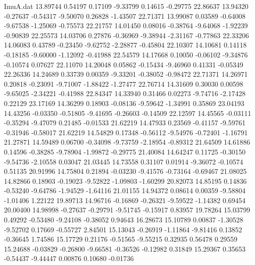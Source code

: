 \begin{filecontents}{ImuA.dat}
  13.89744    0.54197    0.17109   -9.33799    0.14615   -0.29775   22.86637
  13.94320   -0.27637   -0.54317   -9.50070    0.26828   -1.43507   22.71371
  13.99087    0.03589   -0.64008   -9.67538   -1.25069   -0.75573   22.21757
  14.01450    0.08016   -0.38764   -9.64068   -1.92239   -0.90839   22.25573
  14.03706    0.27876   -0.36969   -9.38944   -2.31167   -0.77863   22.33206
  14.06083    0.43789   -0.23450   -9.62752   -2.28877   -0.45804   22.10307
  14.10681    0.14118   -0.18185   -9.60000   -1.12092   -0.41988   22.54579
  14.17668    0.10050   -0.06102   -9.34876   -0.10574    0.07627   22.11070
  14.20048    0.05862   -0.15434   -9.46960    0.41331   -0.05349   22.26336
  14.24689    0.33739    0.00359   -9.33201   -0.38052   -0.98472   22.71371
  14.26971    0.20818   -0.23091   -9.71007   -1.88422   -1.27477   22.76714
  14.31609    0.30030    0.00598   -9.65025   -2.34221   -0.41988   22.84347
  14.33940    0.31466    0.02273   -9.74716   -2.17428    0.22129   23.17169
  14.36299    0.18903   -0.08136   -9.59642   -1.34991    0.35869   23.04193
  14.43256   -0.03350   -0.51805   -9.41695   -0.26603   -0.14509   22.12597
  14.45565   -0.03111   -0.35294   -9.47079    0.21485   -0.01533   21.62219
  14.47933    0.23569   -0.41157   -9.59761   -0.31946   -0.58017   21.62219
  14.54829    0.17348   -0.56112   -9.54976   -0.72401   -1.16791   21.27871
  14.59489    0.06700   -0.34098   -9.73759   -2.18954   -0.89312   21.64509
  14.61886    0.14596   -0.38285   -9.78904   -1.99872   -0.29775   21.40084
  14.64247    0.11725   -0.30150   -9.54736   -2.10558    0.03047   21.03445
  14.73558    0.31107    0.01914   -9.36072   -0.10574    0.51135   20.91996
  14.75804    0.21894   -0.03230   -9.41576   -0.73164   -0.69467   21.08025
  14.82866    0.18903   -0.19023   -9.52822   -1.09803   -1.60299   20.82073
  14.85195    0.14836   -0.53240   -9.64786   -1.94529   -1.64116   21.01155
  14.94372    0.08614    0.00359   -9.58804   -1.01406    1.22122   19.89713
  14.96716   -0.16869   -0.26321   -9.59522   -1.14382    0.69454   20.00400
  14.98998   -0.27637   -0.29791   -9.51745   -0.15917    0.83957   19.78264
  15.03799    0.49292   -0.53480   -9.24108   -0.38052    0.94643   16.28673
  15.10789    0.00837   -1.30528   -9.52702    0.17669   -0.55727    2.84501
  15.13043   -0.26919   -1.11864   -9.81416    0.13852   -0.36645    1.74586
  15.17729    0.21176   -0.51565   -9.55215    0.32935    0.56478    0.29559
  15.24688   -0.03829   -0.26800   -9.66581   -0.36526   -0.12982    0.31849
  15.29367    0.35653   -0.54437   -9.44447    0.00876    0.10680   -0.01736

\end{filecontents}
